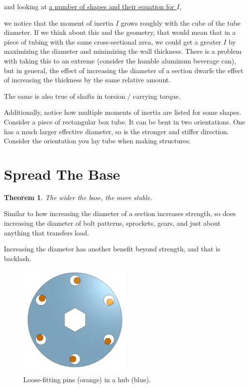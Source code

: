 \documentclass[10pt,letterpaper]{book}
\newtheorem{theorem}{Theorem}
\begin{document}
and looking at \href{https://en.wikipedia.org/wiki/List_of_second_moments_of_area}{\color{red}\underline{a number of shapes and their equation for $I$}},

 we notice that the moment of inertia $I$ grows roughly with the cube of the tube diameter. If we think about this and the geometry, that would mean that in a piece of tubing with the same cross-sectional area, we could get a greater $I$ by maximizing the diameter and minimizing the wall thickness. There is a problem with taking this to an extreme (consider the humble aluminum beverage can), but in general, the effect of increasing the diameter of a section dwarfs the effect of increasing the thickness by the same relative amount.

The same is also true of shafts in torsion / carrying torque.

Additionally, notice how multiple moments of inertia are listed for some shapes. Consider a piece of rectangular box tube. It can be bent in two orientations. One has a much larger effective diameter, so is the stronger and stiffer direction. Consider the orientation you lay tube when making structures.

\section{Spread The Base}

\begin{theorem} \label{theorem:spread_base}
The wider the base, the more stable.
\end{theorem}

Similar to how increasing the diameter of a section increases strength, so does increasing the diameter of bolt patterns, sprockets, gears, and just about anything that transfers load.

Increasing the diameter has another benefit beyond strength, and that is backlash.

\begin{figure}
	\includegraphics[width=0.5\textwidth]{imgs/hub_tolerance.png}
	\caption{Loose-fitting pins (orange) in a hub (blue).}
\end{figure}
\end{document}
